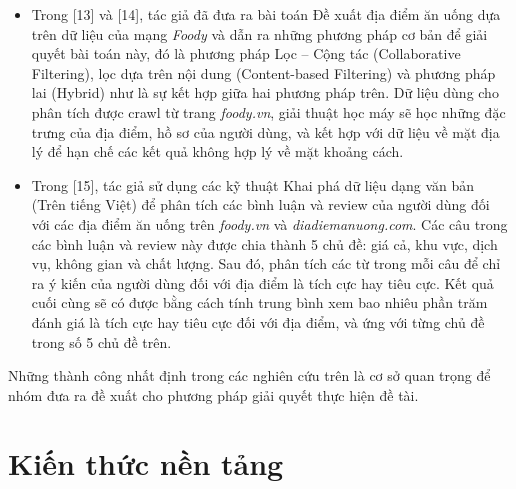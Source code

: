 \documentclass[12pt]{extarticle}
\begin{document}
			\begin{itemize}
				\item Trong [13] và [14], tác giả đã đưa ra bài toán Đề xuất địa điểm ăn uống dựa trên dữ liệu của mạng \textit{Foody}  và dẫn ra những phương pháp cơ bản để giải quyết bài toán này, đó là phương pháp Lọc – Cộng tác (Collaborative Filtering), lọc dựa trên nội dung (Content-based Filtering) và phương pháp lai (Hybrid) như là sự kết hợp giữa hai phương pháp trên. Dữ liệu dùng cho phân tích được crawl từ trang \textit{foody.vn}, giải thuật học máy sẽ học những đặc trưng của địa điểm, hồ sơ của người dùng, và kết hợp với dữ liệu về mặt địa lý để hạn chế các kết quả không hợp lý về mặt khoảng cách. 
				\item Trong [15], tác giả sử dụng các kỹ thuật Khai phá dữ liệu dạng văn bản (Trên tiếng Việt) để phân tích các bình luận và review của người dùng đối với các địa điểm ăn uống trên \textit{foody.vn} và \textit{diadiemanuong.com}. Các câu trong các bình luận và review này được chia thành 5 chủ đề: giá cả, khu vực, dịch vụ, không gian và chất lượng. Sau đó, phân tích các từ trong mỗi câu để chỉ ra ý kiến của người dùng đối với địa điểm là tích cực hay tiêu cực. Kết quả cuối cùng sẽ có được bằng cách tính trung bình xem bao nhiêu phần trăm đánh giá là tích cực hay tiêu cực đối với địa điểm, và ứng với từng chủ đề trong số 5 chủ đề trên.   
				\end{itemize}
			\par Những thành công nhất định trong các nghiên cứu trên là cơ sở quan trọng để nhóm đưa ra đề xuất cho phương pháp giải quyết thực hiện đề tài.
\section{Kiến thức nền tảng}
\end{document}
